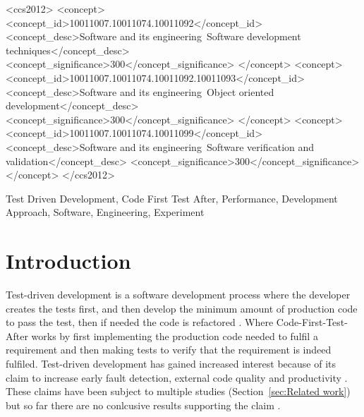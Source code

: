 \documentclass{sig-alternate-05-2015}
\begin{document}
%
%
\begin{CCSXML}
<ccs2012>
<concept>
<concept_id>10011007.10011074.10011092</concept_id>
<concept_desc>Software and its engineering~Software development techniques</concept_desc>
<concept_significance>300</concept_significance>
</concept>
<concept>
<concept_id>10011007.10011074.10011092.10011093</concept_id>
<concept_desc>Software and its engineering~Object oriented development</concept_desc>
<concept_significance>300</concept_significance>
</concept>
<concept>
<concept_id>10011007.10011074.10011099</concept_id>
<concept_desc>Software and its engineering~Software verification and validation</concept_desc>
<concept_significance>300</concept_significance>
</concept>
</ccs2012>
\end{CCSXML}



%
%

%
%
\printccsdesc

\begin{keywords}
Test Driven Development, Code First Test After, Performance, Development Approach, Software, Engineering, \newline Experiment
\end{keywords}

\section{Introduction}
Test-driven development is a software development process where the developer creates the tests first, and then develop the minimum amount of production code to pass the test, then if needed the code is refactored \cite{beck1}. Where Code-First-Test-After works by first implementing the production code needed to fulfil a requirement and then making tests to verify that the requirement is indeed fulfiled. Test-driven development has gained increased interest because of its claim to increase early fault detection, external code quality and productivity \cite{astels1}. These claims have been subject to multiple studies (Section~\ref{sec:Related work}) but so far there are no conlcusive results supporting the claim \cite{shull1}.
\end{document}

